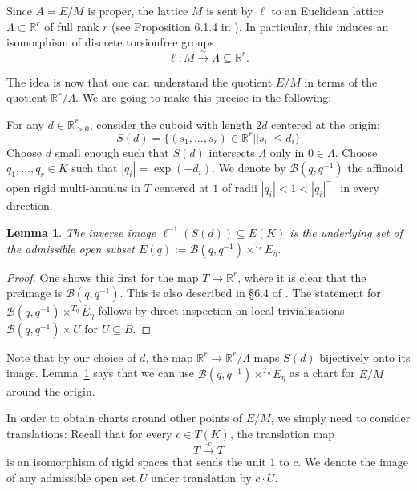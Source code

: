 \documentclass[10pt,oneside]{amsart}
\newtheorem{lemma}[theorem]{Lemma}
\theoremstyle{definition}
\begin{document}
	Since $A=E/M$ is proper, the lattice $M$ is sent by $\ell$ to an Euclidean lattice $\Lambda \subset \mathbb R^r$ of full rank $r$ (see Proposition 6.1.4 in \cite{rigid geometry of curves}). In particular, this induces an isomorphism of discrete torsionfree groups
	\[\ell:M\xrightarrow{\sim} \Lambda\subseteq\mathbb R^r.\]
	
	The idea is now that one can understand the quotient $E/M$ in terms of the quotient $\mathbb R^r/\Lambda$. We are going to make this precise in the following:
	
	For any $d\in \mathbb R_{> 0}^r$, consider the cuboid with length $2d$ centered at the origin:
	\[S(d) = \{(s_1,\dots,s_r)\in \mathbb R^r | |s_i|\leq d_i \}\]
	Choose $d$ small enough such that $S(d)$ intersects $\Lambda$ only in $0\in \Lambda$. Choose
	 $q_1,\dots,q_r\in K$ such that $|q_i|=\exp(-d_i)$. We denote by $\mathcal B(q,q^{-1})$ the affinoid open rigid multi-annulus in $T$ centered at $1$ of radii $|q_i|< 1 < |q_i|^{-1}$ in every direction.
	
	\begin{lemma}\label{cube around origin gives local chart for E/M}
		The inverse image $\ell^{-1}(S(d))\subseteq E(K)$ is the underlying set of the admissible open subset $E(q):=\mathcal B(q,q^{-1})\times^{\overline{T}_\eta}\overline{E}_\eta$.
	\end{lemma}
	\begin{proof}
		One shows this first for the map $T\rightarrow \mathbb R^r$, where it is clear that the preimage is $\mathcal B(q,q^{-1})$. This is also described in \S 6.4 of \cite{FvdP}. The statement for $\mathcal B(q,q^{-1})\times^{\overline{T}_\eta}\overline{E}_\eta$ follows by direct inspection on local trivialisations $\mathcal B(q,q^{-1})\times U$ for $U\subseteq B$.
	\end{proof}
	
	
	Note that by our choice of $d$, the map $\mathbb R^r\rightarrow \mathbb R^r/\Lambda$ maps $S(d)$ bijectively onto its image. 
	Lemma~\ref{cube around origin gives local chart for E/M} says that we can use $\mathcal B(q,q^{-1})\times^{\overline{T}_\eta}\overline{E}_\eta$ as a chart for $E/M$ around the origin.
	
	In order to obtain charts around other points of $E/M$, we simply need to consider translations: Recall that for every $c\in T(K)$, the translation map
	\[T\xrightarrow{\cdot c}T\]
	is an isomorphism of rigid spaces that sends the unit $1$ to $c$. We denote the image of any admissible open set $U$ under translation by $c\cdot U$.
	
\end{document}
